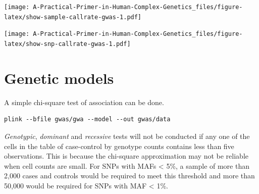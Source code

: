 \documentclass[
]{book}
\newenvironment{Shaded}{\begin{snugshade}}{\end{snugshade}}
\newcommand{\AttributeTok}[1]{\textcolor[rgb]{0.77,0.63,0.00}{#1}}
\newcommand{\ConstantTok}[1]{\textcolor[rgb]{0.00,0.00,0.00}{#1}}
\newcommand{\DecValTok}[1]{\textcolor[rgb]{0.00,0.00,0.81}{#1}}
\newcommand{\FloatTok}[1]{\textcolor[rgb]{0.00,0.00,0.81}{#1}}
\newcommand{\FunctionTok}[1]{\textcolor[rgb]{0.00,0.00,0.00}{#1}}
\newcommand{\NormalTok}[1]{#1}
\newcommand{\OtherTok}[1]{\textcolor[rgb]{0.56,0.35,0.01}{#1}}
\newcommand{\SpecialCharTok}[1]{\textcolor[rgb]{0.00,0.00,0.00}{#1}}
\newcommand{\StringTok}[1]{\textcolor[rgb]{0.31,0.60,0.02}{#1}}
\begin{document}
\texttt{[image: A-Practical-Primer-in-Human-Complex-Genetics\_files/figure-latex/show-sample-callrate-gwas-1.pdf]}

\begin{Shaded}
\end{Shaded}

\texttt{[image: A-Practical-Primer-in-Human-Complex-Genetics\_files/figure-latex/show-snp-callrate-gwas-1.pdf]}

\hypertarget{genetic-models}{%
\section{Genetic models}\label{genetic-models}}

A simple chi-square test of association can be done.

\begin{verbatim}
plink --bfile gwas/gwa --model --out gwas/data
\end{verbatim}

\emph{Genotypic}, \emph{dominant} and \emph{recessive} tests will not be conducted if any one of the cells in the table of case-control by genotype counts contains less than five observations. This is because the chi-square approximation may not be reliable when cell counts are small. For SNPs with MAFs \textless{} 5\%, a sample of more than 2,000 cases and controls would be required to meet this threshold and more than 50,000 would be required for SNPs with MAF \textless{} 1\%.
\end{document}
